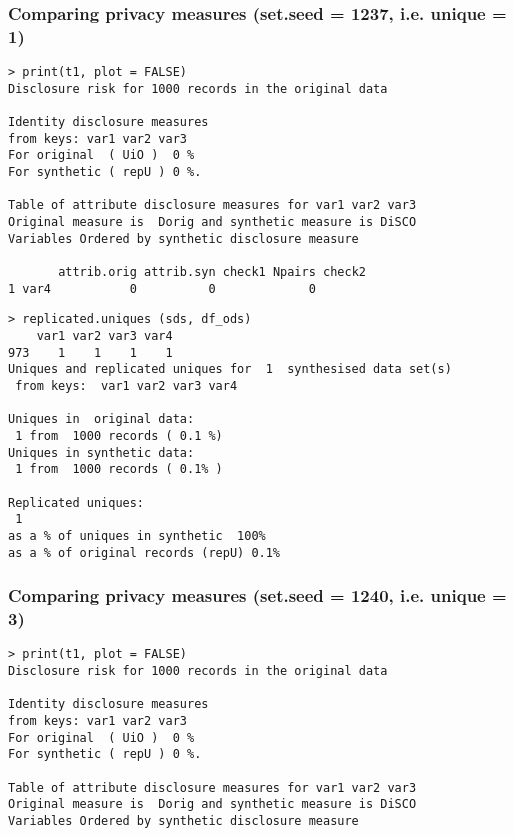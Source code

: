 \documentclass[t,8pt,utfx8]{beamer}
\begin{document}
\begin{spacing}{1.25}
\begin{frame}[fragile]
\frametitle{Comparing privacy measures (set.seed = 1237, i.e. unique = 1)}
  


\begin{minipage}[t]{0.48\textwidth}
\begin{lstlisting}
> print(t1, plot = FALSE)
Disclosure risk for 1000 records in the original data

Identity disclosure measures
from keys: var1 var2 var3 
For original  ( UiO )  0 %
For synthetic ( repU ) 0 %.

Table of attribute disclosure measures for var1 var2 var3 
Original measure is  Dorig and synthetic measure is DiSCO 
Variables Ordered by synthetic disclosure measure

       attrib.orig attrib.syn check1 Npairs check2
1 var4           0          0             0     
\end{lstlisting}
\end{minipage}%
  \hfill%
\begin{minipage}[t]{0.48\textwidth}
\begin{lstlisting}
> replicated.uniques (sds, df_ods)
    var1 var2 var3 var4
973    1    1    1    1
Uniques and replicated uniques for  1  synthesised data set(s)
 from keys:  var1 var2 var3 var4 

Uniques in  original data:
 1 from  1000 records ( 0.1 %) 
Uniques in synthetic data:
 1 from  1000 records ( 0.1% )

Replicated uniques:
 1
as a % of uniques in synthetic  100%
as a % of original records (repU) 0.1%
\end{lstlisting}
\end{minipage}
\end{frame}

\begin{frame}[fragile]
\frametitle{Comparing privacy measures (set.seed = 1240, i.e. unique = 3)}
  


\begin{minipage}[t]{0.48\textwidth}
\begin{lstlisting}
> print(t1, plot = FALSE)
Disclosure risk for 1000 records in the original data

Identity disclosure measures
from keys: var1 var2 var3 
For original  ( UiO )  0 %
For synthetic ( repU ) 0 %.

Table of attribute disclosure measures for var1 var2 var3 
Original measure is  Dorig and synthetic measure is DiSCO 
Variables Ordered by synthetic disclosure measure


\end{lstlisting}
\end{minipage}
\end{frame}
\end{spacing}
\end{document}
